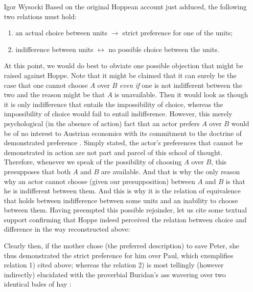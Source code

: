 \begin{artengenv}{Igor Wysocki}
Based on the original Hoppean account just adduced, the following two relations must hold:

\begin{enumerate}
\item an actual choice between units $\rightarrow$ strict preference for one of the units;
\item indifference between units $\leftrightarrow$ no possible choice between the units.
\end{enumerate}
At this point, we would do best to obviate one possible objection that might be raised against Hoppe. Note that it might be claimed that it can surely be the case that one cannot choose $A$ over $B$ \textit{even if} one is not indifferent between the two and the reason might be that $A$ is unavailable. Then it would look as though it is only indifference that entails the impossibility of choice, whereas the impossibility of choice would fail to entail indifference. However, this merely psychological (in the absence of action) fact that an actor prefers $A$ over $B$ would be of no interest to Austrian economics with its commitment to the doctrine of demonstrated preference
\parencite[see \textit{inter alia}][]{rothbard_toward_2011}. %
 Simply stated, the actor's preferences that cannot be demonstrated in action are not part and parcel of this school of thought. Therefore, whenever we speak of the possibility of choosing $A$ over $B$, this presupposes that both $A$ and $B$ are available. And that is why the only reason why an actor cannot choose (given our presupposition) between $A$ and $B$ is that he is indifferent between them. And this is why it is the relation of equivalence that holds between indifference between some units and an inability to choose between them. Having preempted this possible rejoinder, let us cite some textual support confirming that Hoppe 
\parencite*[][p.91]{hoppe_must_2005} %
 indeed perceived the relation between choice and difference in the way reconstructed above:

Clearly then, if the mother chose (the preferred description) to save Peter, she thus demonstrated the strict preference for him over Paul, which exemplifies relation 1) cited above; whereas the relation 2) is most tellingly (however indirectly) elucidated with the proverbial Buridan's ass wavering over two identical bales of hay
\parencite[][p.91]{hoppe_must_2005}:%



\end{artengenv}
